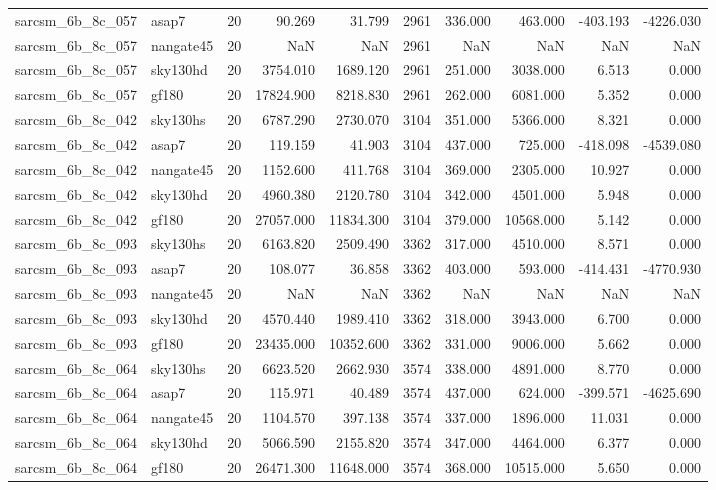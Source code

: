 \begin{longtable}{llrrrrrrrr}
sarcsm\_6b\_8c\_057 & asap7 & 20 & 90.269 & 31.799 & 2961 & 336.000 & 463.000 & -403.193 & -4226.030 \\
sarcsm\_6b\_8c\_057 & nangate45 & 20 & NaN & NaN & 2961 & NaN & NaN & NaN & NaN \\
sarcsm\_6b\_8c\_057 & sky130hd & 20 & 3754.010 & 1689.120 & 2961 & 251.000 & 3038.000 & 6.513 & 0.000 \\
sarcsm\_6b\_8c\_057 & gf180 & 20 & 17824.900 & 8218.830 & 2961 & 262.000 & 6081.000 & 5.352 & 0.000 \\
sarcsm\_6b\_8c\_042 & sky130hs & 20 & 6787.290 & 2730.070 & 3104 & 351.000 & 5366.000 & 8.321 & 0.000 \\
sarcsm\_6b\_8c\_042 & asap7 & 20 & 119.159 & 41.903 & 3104 & 437.000 & 725.000 & -418.098 & -4539.080 \\
sarcsm\_6b\_8c\_042 & nangate45 & 20 & 1152.600 & 411.768 & 3104 & 369.000 & 2305.000 & 10.927 & 0.000 \\
sarcsm\_6b\_8c\_042 & sky130hd & 20 & 4960.380 & 2120.780 & 3104 & 342.000 & 4501.000 & 5.948 & 0.000 \\
sarcsm\_6b\_8c\_042 & gf180 & 20 & 27057.000 & 11834.300 & 3104 & 379.000 & 10568.000 & 5.142 & 0.000 \\
sarcsm\_6b\_8c\_093 & sky130hs & 20 & 6163.820 & 2509.490 & 3362 & 317.000 & 4510.000 & 8.571 & 0.000 \\
sarcsm\_6b\_8c\_093 & asap7 & 20 & 108.077 & 36.858 & 3362 & 403.000 & 593.000 & -414.431 & -4770.930 \\
sarcsm\_6b\_8c\_093 & nangate45 & 20 & NaN & NaN & 3362 & NaN & NaN & NaN & NaN \\
sarcsm\_6b\_8c\_093 & sky130hd & 20 & 4570.440 & 1989.410 & 3362 & 318.000 & 3943.000 & 6.700 & 0.000 \\
sarcsm\_6b\_8c\_093 & gf180 & 20 & 23435.000 & 10352.600 & 3362 & 331.000 & 9006.000 & 5.662 & 0.000 \\
sarcsm\_6b\_8c\_064 & sky130hs & 20 & 6623.520 & 2662.930 & 3574 & 338.000 & 4891.000 & 8.770 & 0.000 \\
sarcsm\_6b\_8c\_064 & asap7 & 20 & 115.971 & 40.489 & 3574 & 437.000 & 624.000 & -399.571 & -4625.690 \\
sarcsm\_6b\_8c\_064 & nangate45 & 20 & 1104.570 & 397.138 & 3574 & 337.000 & 1896.000 & 11.031 & 0.000 \\
sarcsm\_6b\_8c\_064 & sky130hd & 20 & 5066.590 & 2155.820 & 3574 & 347.000 & 4464.000 & 6.377 & 0.000 \\
sarcsm\_6b\_8c\_064 & gf180 & 20 & 26471.300 & 11648.000 & 3574 & 368.000 & 10515.000 & 5.650 & 0.000 \\

\end{longtable}
